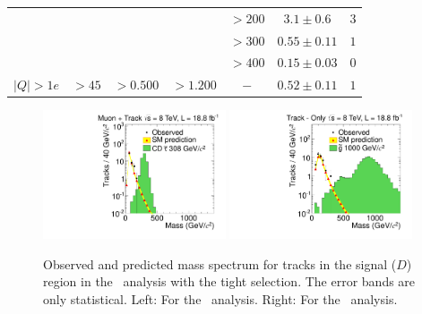\begin{table}
\begin{center}
\begin{tabular}{|l|c|c|c|c|cc|}
                        &                         &                            &                            & $> 200$   & $3.1\pm0.6$    & $3$  \\
                        &                         &                            &                            & $> 300$   & $0.55\pm0.11$  & $1$  \\
                        &                         &                            &                            & $> 400$   & $0.15\pm0.03$  & $0$ \\ \hline
$|Q|>1e$                &           $>45$         &       $> 0.500$            &        $> 1.200 $          &    $-$    & $0.52\pm 0.11$ & $1$ \\ \hline

 \end{tabular}
 \end{center}
\end{table}

\begin{figure}
 \begin{center}
  \includegraphics[clip=false, trim=0.0cm 0cm 0.0cm 0cm, width=0.48\textwidth]{figures/tkmu/RescaleNoRatio_Mass_8TeV_TightNoSMMC}
  \includegraphics[clip=false, trim=0.0cm 0cm 0.0cm 0cm, width=0.48\textwidth]{figures/tkonly/RescaleNoRatio_Mass_8TeV_TightNoSMMC}
 \end{center}
 \caption[Observed and predicted mass spectrum for tracks in the signal region with the final selection thresholds in the \tktof\ and \tkonly\ analyses.]
{Observed and predicted mass spectrum for tracks in the signal ($D$) region in the \tktof\ analysis with the tight selection.
The error bands are only statistical. Left: For the \tktof\ analysis. Right: For the \tkonly\ analysis.}
\label{fig:TightMassDistribution}
\end{figure}